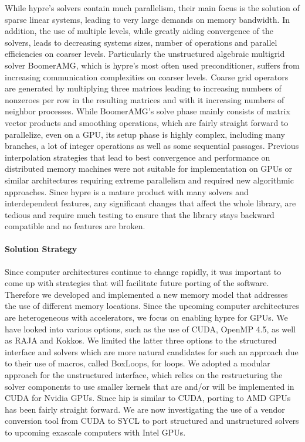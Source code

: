 While hypre's solvers contain much parallelism, their main focus is the solution of sparse linear systems, leading to  very large demands on memory bandwidth. In addition, the use of multiple levels, while greatly aiding convergence of the solvers, leads to decreasing systems sizes, number of operations and parallel efficiencies on coarser levels. Particularly the unstructured algebraic multigrid solver BoomerAMG\cite{HeYa2002}, which is hypre's most often used preconditioner, suffers from increasing communication complexities on coarser levels. Coarse grid operators are generated by multiplying three matrices leading to increasing numbers of nonzeroes per row in the resulting matrices and with it increasing numbers of neighbor processes. While BoomerAMG's solve phase mainly consists of matrix vector products and smoothing operations, which are fairly straight forward to parallelize, even on a GPU, its setup phase is highly complex, including many branches, a lot of integer operations as well as some sequential passages. Previous interpolation strategies that lead to best convergence and performance on distributed memory machines were not suitable for implementation on GPUs or similar architectures requiring extreme parallelism and required new algorithmic approaches. Since hypre is a mature product with many solvers and interdependent features, any significant changes that affect the whole library, are tedious and require much testing to ensure that the library stays backward compatible and no features are broken.

\paragraph{Solution Strategy}

Since computer architectures continue to change rapidly, it was important to come up with strategies that will facilitate future porting of the software. Therefore we developed and implemented a new memory model that addresses the use of different memory locations.
Since the upcoming computer architectures are heterogeneous with accelerators, we focus on enabling hypre for GPUs. We have looked into various options, such as the use of CUDA, OpenMP 4.5, as well as RAJA and Kokkos. We limited the latter three options to the structured interface and solvers which are more natural candidates for such an approach due to their use of macros, called BoxLoops, for loops. We adopted a modular approach for the unstructured interface, which relies on the restructuring the solver components to use smaller kernels that are and/or will be implemented in CUDA for Nvidia GPUs. Since hip is similar to CUDA, porting to AMD GPUs has been fairly straight forward. We are now investigating the use of a vendor conversion tool from CUDA to SYCL to port structured and unstructured solvers to upcoming exascale computers with Intel GPUs.

